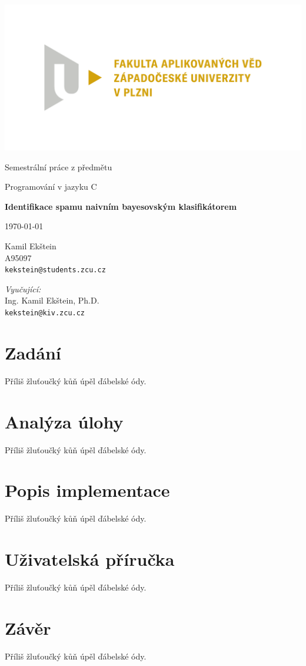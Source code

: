 \documentclass[12pt]{report}
\begin{document}
	
	\begin{titlepage}
		\centering
		\Large
		\sffamily
		
		\includegraphics[width=.7\textwidth]{fav}
		
		Semestrální práce z předmětu
		
		Programování v jazyku C
		
		\vspace{20mm}
		{\Huge\bfseries Identifikace spamu naivním bayesovským klasifikátorem}
		
		\vspace{20mm}
		\today 
		
		\vfill			%
		\raggedright	%
		Kamil Ekštein\\		%
		A95097\\
		\texttt{kekstein@students.zcu.cz}
		
		\vspace{\baselineskip}
		\emph{Vyučující:}\\
		Ing. Kamil Ekštein, Ph.D.\\
		\texttt{kekstein@kiv.zcu.cz}
	\end{titlepage}
	
	\tableofcontents

	\chapter{Zadání}
	Příliš žluťoučký kůň úpěl ďábelské ódy.
	
	\chapter{Analýza úlohy}
	Příliš žluťoučký kůň úpěl ďábelské ódy.
	
	\chapter{Popis implementace}
	Příliš žluťoučký kůň úpěl ďábelské ódy.
	
	\chapter{Uživatelská příručka}
	Příliš žluťoučký kůň úpěl ďábelské ódy.
	
	\chapter{Závěr}
	Příliš žluťoučký kůň úpěl ďábelské ódy.
	
\end{document}
